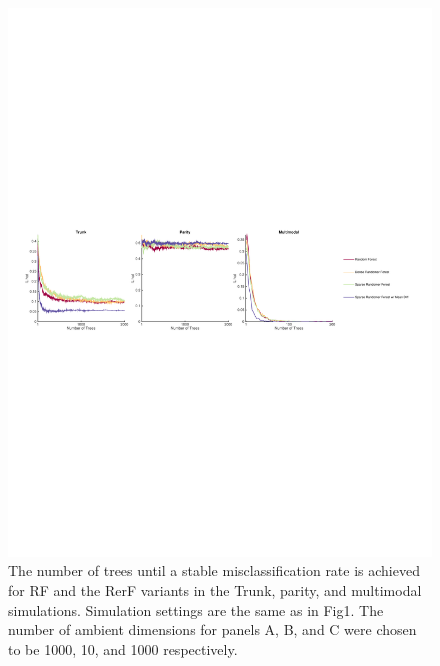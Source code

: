 \documentclass{article} %
\begin{document}
\begin{figure}[h]
\begin{center}
\includegraphics[trim=0in 8in 0in 8in, clip=true, width=\linewidth]{../Figures/pdf/Fig0_nTrees}
\end{center}
\caption{The number of trees until a stable misclassification rate is achieved for RF and the RerF variants in the Trunk, parity, and multimodal simulations. Simulation settings are the same as in Fig1. The number of ambient dimensions for panels A, B, and C were chosen to be 1000, 10, and 1000 respectively.}
\end{figure}
\end{document}
